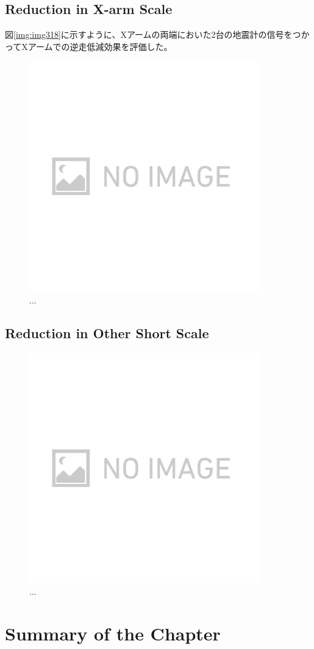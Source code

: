 \subsection{Reduction in X-arm Scale}
図\ref{img:img318}に示すように、Xアームの両端においた2台の地震計の信号をつかってXアームでの逆走低減効果を評価した。

\begin{figure}[H]
  \begin{center}   
    \includegraphics[width=10.0cm]{./img_chap3/img319.png}
    \caption{...}\label{img:img319}
  \end{center}
\end{figure}

\subsection{Reduction in Other Short Scale}

\begin{figure}[H]
  \begin{center}   
    \includegraphics[width=10.0cm]{./img_chap3/img320.png}
    \caption{...}\label{img:img320}
  \end{center}
\end{figure}



\section{Summary of the Chapter}
